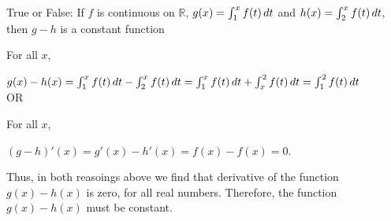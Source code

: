 \documentclass{ximera}
\author{Steven Gubkin}
\begin{document}
\begin{exercise}

True or False:  If  $f$ is continuous on $\mathbb{R}$,  $g(x)= \int_1^{x} f(t) \,d t$ and  $h(x)= \int_2^x f(t) \,d t$, then $g-h$ is a constant function

\begin{hint}
For all $x$,


 $g(x)-h(x)=\int_1^{x} f(t) \,d t- \int_2^x f(t) \,d t=\int_1^{x} f(t) \,d t+ \int_x^2 f(t) \,d t=\int_1^{2} f(t) \,d t$ \\

 
 OR
 
 
 For all $x$,
 
 
 $(g-h)'(x)=g'(x)-h'(x)=f(x)-f(x)=0$.
 
 
 Thus, in both reasoings above we find that derivative of the function $g(x)-h(x)$ is zero, for all real numbers. Therefore, the function $g(x)-h(x)$ must be constant.
\end{hint}
\begin{prompt}
	\begin{multipleChoice}
	\end{multipleChoice}
\end{prompt}

\end{exercise}
\end{document}
